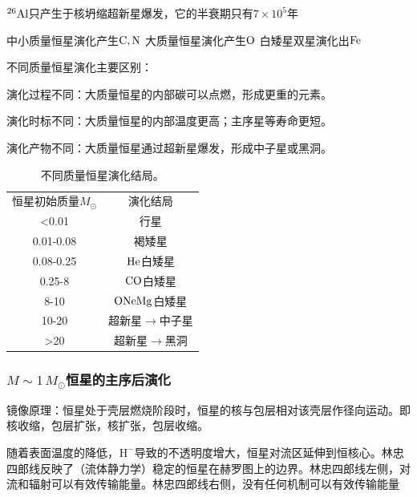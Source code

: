 \documentclass[../天体物理基础.tex]{subfiles}
\begin{document}
$\rm ^{26}Al$只产生于核坍缩超新星爆发，它的半衰期只有$7\times10^5$年

中小质量恒星演化产生$\rm C,N$
大质量恒星演化产生$\rm O$
白矮星双星演化出$\rm Fe$

不同质量恒星演化主要区别：

演化过程不同：大质量恒星的内部碳可以点燃，形成更重的元素。

演化时标不同：大质量恒星的内部温度更高；主序星等寿命更短。

演化产物不同：大质量恒星通过超新星爆发，形成中子星或黑洞。

\begin{table}[!htbp]
\centering
\caption{不同质量恒星演化结局。}
\begin{tabular}{c c}
\hline
恒星初始质量$M_\odot$ & 演化结局\\
\cline{1-2}
<0.01 & 行星\\
\cline{1-2}
0.01-0.08 & 褐矮星\\
\cline{1-2}
0.08-0.25 & $\rm He$白矮星\\
\cline{1-2}
0.25-8 & $\rm CO$白矮星\\
\cline{1-2}
8-10 & $\rm ONeMg$白矮星\\
\cline{1-2}
10-20 & 超新星$\to$中子星\\
\cline{1-2}
>20 & 超新星$\to$黑洞\\
\hline
\end{tabular}
\label{}
\end{table}

\subsubsection{\texorpdfstring{$M\sim1\,M_{\odot}$}{}恒星的主序后演化}

镜像原理：恒星处于壳层燃烧阶段时，恒星的核与包层相对该壳层作径向运动。即核收缩，包层扩张，核扩张，包层收缩。

随着表面温度的降低，${}^{}\mathrm{H}^{-}$导致的不透明度增大，恒星对流区延伸到恒核心。林忠四郎线反映了（流体静力学）稳定的恒星在赫罗图上的边界。林忠四郎线左侧，对流和辐射可以有效传输能量。林忠四郎线右侧，没有任何机制可以有效传输能量
\end{document}
